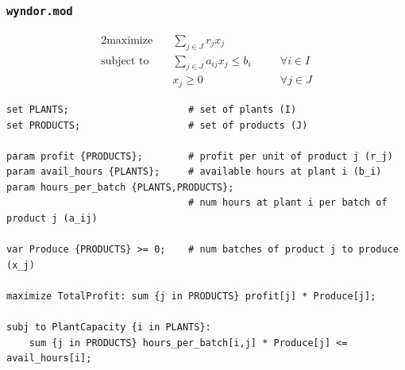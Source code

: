\begin{frame}[fragile]

	\frametitle{{\tt wyndor.mod}}

	{\footnotesize
	\begin{alignat*}{2}
	\text{maximize} \quad & \sum_{j\in J} r_jx_j && \\
	\text{subject to} \quad & \sum_{j\in J} a_{ij}x_j \le b_i &\quad& \forall i\in I \\
		& x_j \ge 0 && \forall j\in J
	\end{alignat*}
	}
	
	\vspace{-1em}
	
\begin{lstlisting}
set PLANTS;						# set of plants (I)
set PRODUCTS;					# set of products (J)

param profit {PRODUCTS};		# profit per unit of product j (r_j)
param avail_hours {PLANTS};		# available hours at plant i (b_i)
param hours_per_batch {PLANTS,PRODUCTS};
								# num hours at plant i per batch of product j (a_ij)
							
var Produce {PRODUCTS} >= 0;	# num batches of product j to produce (x_j)

maximize TotalProfit: sum {j in PRODUCTS} profit[j] * Produce[j];

subj to PlantCapacity {i in PLANTS}: 
	sum {j in PRODUCTS} hours_per_batch[i,j] * Produce[j] <= avail_hours[i];
\end{lstlisting}

\end{frame}


